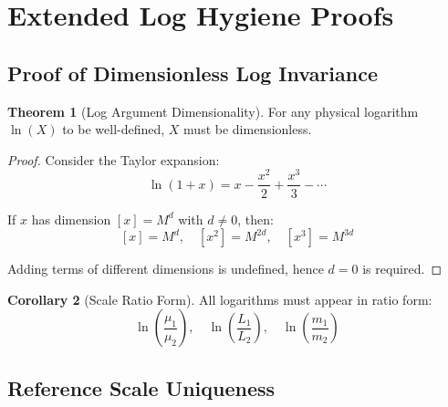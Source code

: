\documentclass[11pt,a4paper]{article}
\theoremstyle{definition}
\newtheorem{theorem}{Theorem}[section]
\newtheorem{corollary}[theorem]{Corollary}
\begin{document}
\section{Extended Log Hygiene Proofs}
\label{app:log_proofs}

\subsection{Proof of Dimensionless Log Invariance}
\label{subsec:log_proof}

\begin{theorem}[Log Argument Dimensionality]
\label{thm:log_dim}
For any physical logarithm $\ln(X)$ to be well-defined, $X$ must be dimensionless.
\end{theorem}

\begin{proof}
Consider the Taylor expansion:
\begin{equation}
\label{eq:log_taylor}
\ln(1 + x) = x - \frac{x^2}{2} + \frac{x^3}{3} - \cdots
\end{equation}

If $x$ has dimension $[x] = M^d$ with $d \neq 0$, then:
\begin{equation}
\label{eq:dim_mismatch}
[x] = M^d, \quad [x^2] = M^{2d}, \quad [x^3] = M^{3d}
\end{equation}

Adding terms of different dimensions is undefined, hence $d = 0$ is required.
\end{proof}

\begin{corollary}[Scale Ratio Form]
\label{cor:ratio}
All logarithms must appear in ratio form:
\begin{equation}
\label{eq:ratio_form}
\ln\left(\frac{\mu_1}{\mu_2}\right), \quad \ln\left(\frac{L_1}{L_2}\right), \quad \ln\left(\frac{m_1}{m_2}\right)
\end{equation}
\end{corollary}

\subsection{Reference Scale Uniqueness}
\label{subsec:ref_unique}
\end{document}
